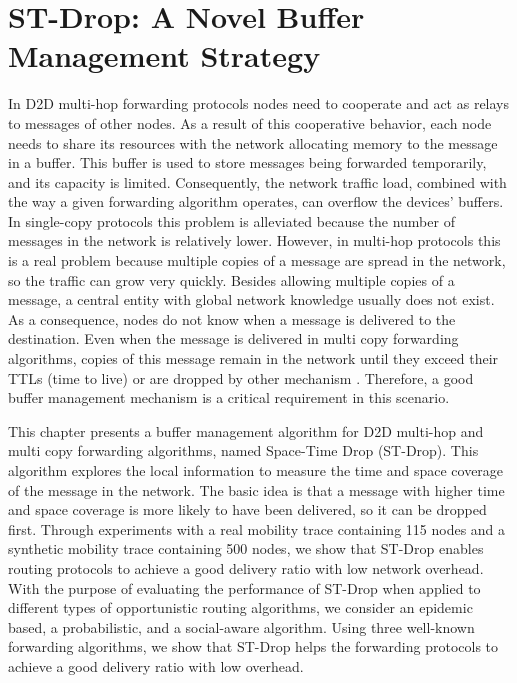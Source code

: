 \chapter{ST-Drop: A Novel Buffer Management Strategy}
\label{ch:StDrop}

In D2D multi-hop forwarding protocols nodes need to cooperate and act as relays to messages of other nodes. As a result of this cooperative behavior,
each node needs to share its resources with the network allocating memory to the message in a buffer. This buffer is used to store messages being forwarded temporarily, and its capacity is limited. Consequently, the network traffic load, combined with the way a given forwarding algorithm operates, can overflow the devices’ buffers. In single-copy protocols this problem is alleviated because the number of messages in the network is relatively lower. However, in multi-hop protocols this is a real problem because multiple copies of a message are spread in the network, so the traffic can grow very quickly. Besides allowing multiple copies of a message, a central entity with global network knowledge usually does not exist. As a consequence, nodes do not know when a message is delivered to the destination. Even when the message is delivered in multi copy forwarding algorithms, copies of this message remain in the network until they exceed their TTLs (time to live) or are dropped by other mechanism \citep{bindra2012need}. Therefore, a good buffer management mechanism is a critical requirement in this scenario.

This chapter presents a buffer management algorithm for D2D multi-hop and multi copy forwarding algorithms, named Space-Time Drop (ST-Drop). This algorithm explores the local information to measure the time and space coverage of the message in the network. The basic idea is that a message with higher time and space coverage is more likely to have
been delivered, so it can be dropped first. Through experiments with a real mobility trace containing 115 nodes and a synthetic mobility trace containing 500 nodes, we show that ST-Drop enables routing protocols to achieve a good delivery ratio with low network overhead. With the purpose of evaluating the performance of ST-Drop when applied to different types of opportunistic routing algorithms, we consider an epidemic based, a probabilistic, and a social-aware algorithm. Using three well-known forwarding algorithms, we show that ST-Drop helps the forwarding protocols to achieve a good delivery ratio with low overhead.

